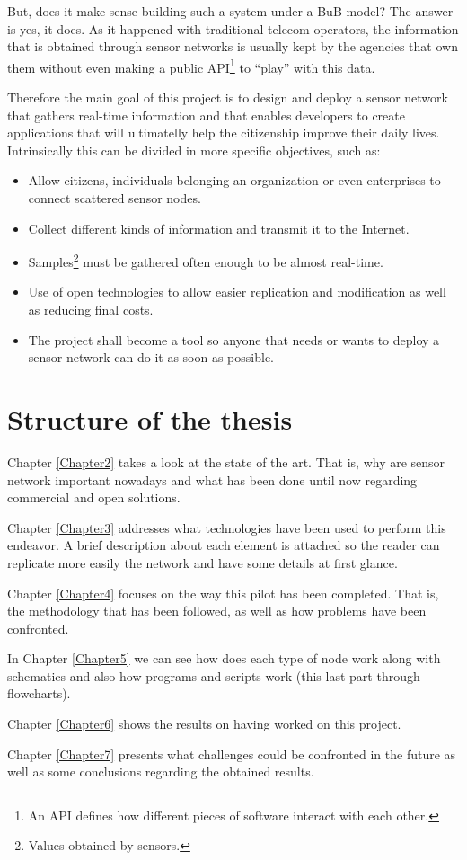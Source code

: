 But, does it make sense building such a system under a BuB model? The answer is yes, it does. As it happened with traditional telecom operators, the information that is obtained through sensor networks is usually kept by the agencies that own them without even making a public API\footnote{An API defines how different pieces of software interact with each other.} to ``play'' with this data.

Therefore the main goal of this project is to design and deploy a sensor network that gathers real-time information and that enables developers to create applications that will ultimatelly help the citizenship improve their daily lives. Intrinsically this can be divided in more specific objectives, such as:

\begin{itemize}
    \item Allow citizens, individuals belonging an organization or even enterprises to connect scattered sensor nodes.
    \item Collect different kinds of information and transmit it to the Internet.
    \item Samples\footnote{Values obtained by sensors.} must be gathered often enough to be almost real-time.
    \item Use of open technologies to allow easier replication and modification as well as reducing final costs.
    \item The project shall become a tool so anyone that needs or wants to deploy a sensor network can do it as soon as possible.
\end{itemize}

\section{Structure of the thesis}

Chapter \ref{Chapter2} takes a look at the state of the art. That is, why are sensor network important nowadays and what has been done until now regarding commercial and open solutions.

Chapter \ref{Chapter3} addresses what technologies have been used to perform this endeavor. A brief description about each element is attached so the reader can replicate more easily the network and have some details at first glance.

Chapter \ref{Chapter4} focuses on the way this pilot has been completed. That is, the methodology that has been followed, as well as how problems have been confronted.

In Chapter \ref{Chapter5} we can see how does each type of node work along with schematics and also how programs and scripts work (this last part through flowcharts).

Chapter \ref{Chapter6} shows the results on having worked on this project.

Chapter \ref{Chapter7} presents what challenges could be confronted in the future as well as some conclusions regarding the obtained results.
